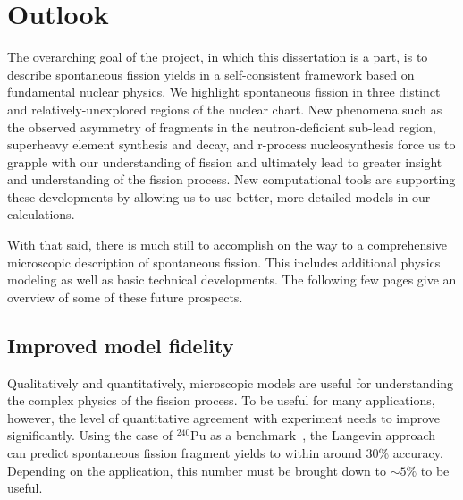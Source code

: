 \chapter{Outlook}\label{chap:Outlook}

The overarching goal of the project, in which this dissertation is a part, is to describe spontaneous fission yields in a self-consistent framework based on fundamental nuclear physics. We highlight spontaneous fission in three distinct and relatively-unexplored regions of the nuclear chart. New phenomena such as the observed asymmetry of fragments in the neutron-deficient sub-lead region, superheavy element synthesis and decay, and r-process nucleosynthesis force us to grapple with our understanding of fission and ultimately lead to greater insight and understanding of the fission process. New computational tools are supporting these developments by allowing us to use better, more detailed models in our calculations.

With that said, there is much still to accomplish on the way to a comprehensive microscopic description of spontaneous fission. This includes additional physics modeling as well as basic technical developments. The following few pages give an overview of some of these future prospects.

\section{Improved model fidelity}
Qualitatively and quantitatively, microscopic models are useful for understanding the complex physics of the fission process. To be useful for many applications, however, the level of quantitative agreement with experiment needs to improve significantly. Using the case of $^{240}$Pu as a benchmark~\cite{Sadhukhan2016}, the Langevin approach can predict spontaneous fission fragment yields to within around 30\% accuracy. Depending on the application, this number must be brought down to ${\sim}5\%$ to be useful.

